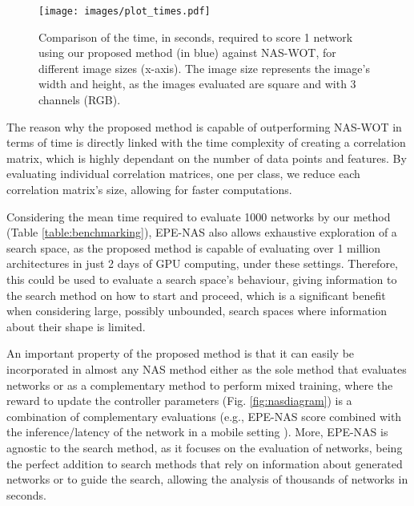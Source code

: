 \documentclass[10pt, conference]{IEEEtran}
\begin{document}
\begin{figure}[t]
    \centering
    \texttt{[image: images/plot\_times.pdf]}
    \caption{Comparison of the time, in seconds, required to score 1 network using our proposed method (in blue) against NAS-WOT, for different image sizes (x-axis). The image size represents the image's width and height, as the images evaluated are square and with 3 channels (RGB). \label{fig:plottimes}}
\end{figure}


The reason why the proposed method is capable of outperforming NAS-WOT in terms of time is directly linked with the time complexity of creating a correlation matrix, which is highly dependant on the number of data points and features. By evaluating individual correlation matrices, one per class, we reduce each correlation matrix's size, allowing for faster computations.

Considering the mean time required to evaluate 1000 networks by our method (Table \ref{table:benchmarking}), EPE-NAS also allows exhaustive exploration of a search space, as the proposed method is capable of evaluating over 1 million architectures in just 2 days of GPU computing, under these settings. Therefore, this could be used to evaluate a search space's behaviour, giving information to the search method on how to start and proceed, which is a significant benefit when considering large, possibly unbounded, search spaces where information about their shape is limited.


An important property of the proposed method is that it can easily be incorporated in almost any NAS method either as the sole method that evaluates networks or as a complementary method to perform mixed training, where the reward to update the controller parameters (Fig. \ref{fig:nasdiagram}) is a combination of complementary evaluations (e.g., EPE-NAS score combined with the inference/latency of the network in a mobile setting \cite{tan2019mnasnet, wu2019fbnet}). More, EPE-NAS is agnostic to the search method, as it focuses on the evaluation of networks, being the perfect addition to search methods that rely on information about generated networks or to guide the search, allowing the analysis of thousands of networks in seconds.
\end{document}
